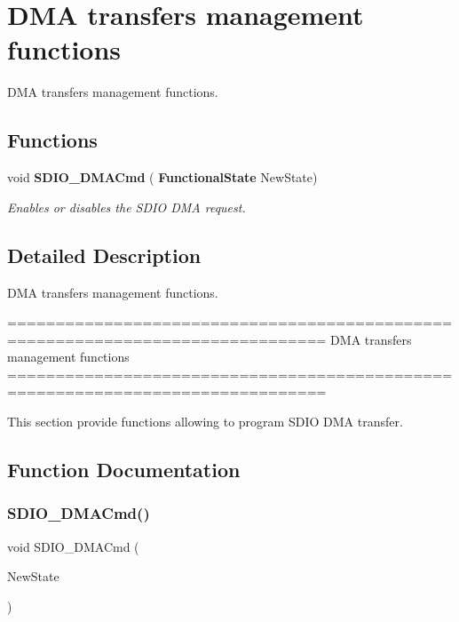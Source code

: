 \section{D\+MA transfers management functions}
\label{group__SDIO__Group6}


D\+MA transfers management functions.  


\subsection*{Functions}
\begin{DoxyCompactItemize}
\item 
void \textbf{ S\+D\+I\+O\+\_\+\+D\+M\+A\+Cmd} (\textbf{ Functional\+State} New\+State)
\begin{DoxyCompactList}\small\item\em Enables or disables the S\+D\+IO D\+MA request. \end{DoxyCompactList}\end{DoxyCompactItemize}


\subsection{Detailed Description}
D\+MA transfers management functions. 

\begin{DoxyVerb} ===============================================================================
              DMA transfers management functions
 ===============================================================================  

  This section provide functions allowing to program SDIO DMA transfer.\end{DoxyVerb}
 

\subsection{Function Documentation}
\mbox{\label{group__SDIO__Group6_gad36fde5ec0ce0c2089b9d971c2271e6e}} 
\subsubsection{S\+D\+I\+O\+\_\+\+D\+M\+A\+Cmd()}
{\footnotesize\ttfamily void S\+D\+I\+O\+\_\+\+D\+M\+A\+Cmd (\begin{DoxyParamCaption}\item[{\textbf{ Functional\+State}}]{New\+State }\end{DoxyParamCaption})}



